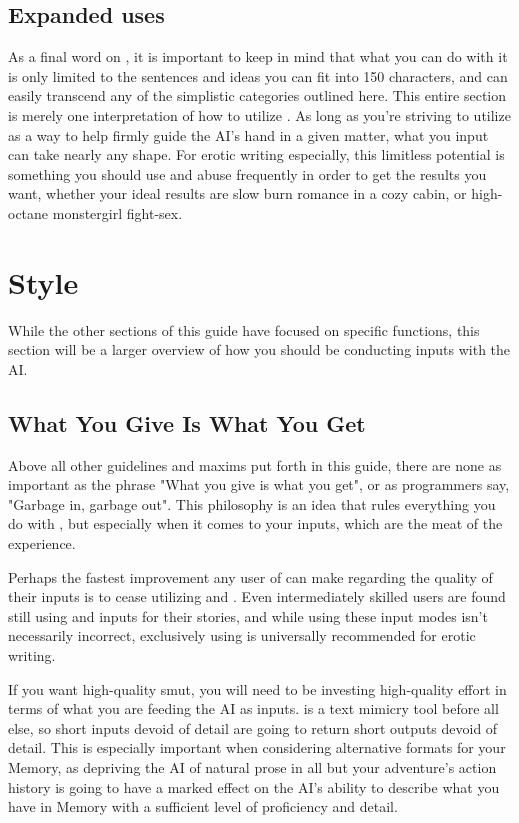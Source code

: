 ﻿\documentclass[Coomer-main.tex]{subfiles}
\begin{document}
\section{Expanded uses}

As a final word on \an, it is important to keep in mind that what you can do with it is only limited to the sentences and ideas you can fit into 150 characters, and can easily transcend any of the simplistic categories outlined here. This entire section is merely one interpretation of how to utilize \an. As long as you're striving to utilize \an as a way to help firmly guide the AI's hand in a given matter, what you input can take nearly any shape. For erotic writing especially, this limitless potential is something you should use and abuse frequently in order to get the results you want, whether your ideal results are slow burn romance in a cozy cabin, or high-octane monstergirl fight-sex.

\chapter{Style}

While the other sections of this guide have focused on specific functions, this section will be a larger overview of how you should be conducting inputs with the AI.

\section{What You Give Is What You Get}

Above all other guidelines and maxims put forth in this guide, there are none as important as the phrase "What you give is what you get", or as programmers say, "Garbage in, garbage out". This philosophy is an idea that rules everything you do with \aid, but especially when it comes to your inputs, which are the meat of the \aid experience.

Perhaps the fastest improvement any user of \aid can make regarding the quality of their inputs is to cease utilizing \Do and \say. Even intermediately skilled users are found still using \Do and \say inputs for their stories, and while using these input modes isn't necessarily incorrect, exclusively using \story is universally recommended for erotic writing.

If you want high-quality smut, you will need to be investing high-quality effort in terms of what you are feeding the AI as inputs. \aid is a text mimicry tool before all else, so short inputs devoid of detail are going to return short outputs devoid of detail. This is especially important when considering alternative formats for your Memory, as depriving the AI of natural prose in all but your adventure’s action history is going to have a marked effect on the AI’s ability to describe what you have in Memory with a sufficient level of proficiency and detail.
\end{document}
